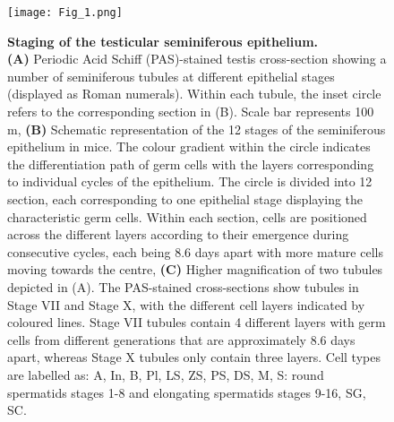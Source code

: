 \newpage

\begin{figure}[!h]
\centering
\texttt{[image: Fig\_1.png]}
\caption[Staging of the testicular seminiferous epithelium]{\textbf{Staging of the testicular seminiferous epithelium.}\\
\textbf{(A)} Periodic Acid Schiff (PAS)-stained testis cross-section showing a number of seminiferous tubules at different epithelial stages (displayed as Roman numerals). Within each tubule, the inset circle refers to the corresponding section in (B). 
Scale bar represents 100 \textmu{}m, 
\textbf{(B)} Schematic representation of the 12 stages of the seminiferous epithelium in mice. 
The colour gradient within the circle indicates the differentiation path of germ cells with the layers corresponding to individual cycles of the epithelium. 
The circle is divided into 12 section, each corresponding to one epithelial stage displaying the characteristic germ cells. 
Within each section, cells are positioned across the different layers according to their emergence during consecutive cycles, each being 8.6 days apart with more mature cells moving towards the centre, 
\textbf{(C)} Higher magnification of two tubules depicted in (A). The PAS-stained cross-sections show tubules in Stage VII and Stage X, with the different cell layers indicated by coloured lines. 
Stage VII tubules contain 4 different layers with germ cells from different generations that are approximately 8.6 days apart, whereas Stage X tubules only contain three layers. 
Cell types are labelled as: \gls{A}, \gls{In}, \gls{B}, \gls{Pl}, \gls{LS}, \gls{ZS}, \gls{PS}, \gls{DS}, \gls{M}, \gls{S}: round spermatids stages 1-8 and elongating spermatids stages 9-16, \gls{SG}, \gls{SC}.}
\label{fig3:cell_staging}
\end{figure}

\newpage

